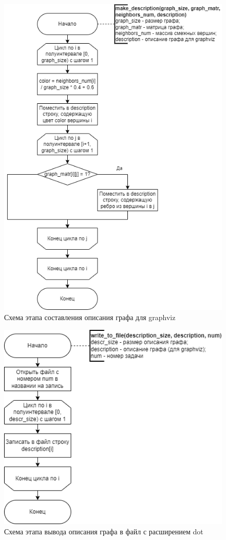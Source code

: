 \begin{figure}[h!btp]
	\centering
	\includegraphics[width=360pt]{inc/make_description.png}
	\caption{Схема этапа составления описания графа для graphviz}
	\label{fig:make_description}	
\end{figure}

\clearpage

\begin{figure}[h!btp]
	\centering
	\includegraphics[width=360pt]{inc/write_to_file.png}
	\caption{Схема этапа вывода описания графа в файл с расширением dot}
	\label{fig:write_to_file}	
\end{figure}

